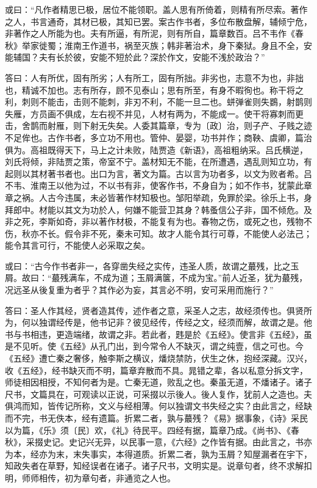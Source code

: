 \documentclass[]{article}
\begin{document}
或曰：``凡作者精思已极，居位不能领职。盖人思有所倚着，则精有所尽索。著作之人，书言通奇，其材已极，其知已罢。案古作书者，多位布散盘解，辅倾宁危，非著作之人所能为也。夫有所逼，有所泥，则有所自，篇章数百。吕不韦作《春秋》举家徙蜀；淮南王作道书，祸至灭族；韩非著治术，身下秦狱。身且不全，安能辅国？夫有长於彼，安能不短於此？深於作文，安能不浅於政治？''

答曰：人有所优，固有所劣；人有所工，固有所拙。非劣也，志意不为也，非拙也，精诚不加也。志有所存，顾不见泰山；思有所至，有身不暇徇也。称干将之利，刺则不能击，击则不能刺，非刃不利，不能一旦二也。蛢弹雀则失鷃，射鹊则失雁，方员画不俱成，左右视不并见，人材有两为，不能成一。使干将寡刺而更击，舍鹊而射雁，则下射无失矣。人委其篇章，专为〔政〕治，则子产、子贱之迹不足侔也。古作书者，多立功不用也。管仲、晏婴，功书并作；商鞅、虞卿，篇治俱为。高祖既得天下，马上之计未败，陆贾造《新语》，高祖粗纳采。吕氏横逆，刘氏将倾，非陆贾之策，帝室不宁。盖材知无不能，在所遭遇，遇乱则知立功，有起则以其材著书者也。出口为言，著文为篇。古以言为功者多，以文为败者希。吕不韦、淮南王以他为过，不以书有非，使客作书，不身自为；如不作书，犹蒙此章章之祸。人古今违属，未必皆著作材知极也。邹阳举疏，免罪於梁。徐乐上书，身拜郎中。材能以其文为功於人，何嫌不能营卫其身？韩蚤信公子非，国不倾危。及非之死，李斯如奇，非以著作材极，不能复有为也。春物之伤，或死之也，残物不伤，秋亦不长。假令非不死，秦未可知。故才人能令其行可尊，不能使人必法己；能令其言可行，不能使人必采取之矣。

或曰：``古今作书者非一，各穿凿失经之实传，违圣人质，故谓之蕞残，比之玉屑。故曰：``蕞残满车，不成为道；玉屑满箧，不成为宝。''前人近圣，犹为蕞残，况远圣从後复重为者乎？其作必为妄，其言必不明，安可采用而施行？''

答曰：圣人作其经，贤者造其传，述作者之意，采圣人之志，故经须传也。俱贤所为，何以独谓经传是，他书记非？彼见经传，传经之文，经须而解，故谓之是。他书与书相违，更造端绪，故谓之非。若此者，韪是於《五经》。使言非《五经》，虽是不见听。使《五经》从孔门出，到今常令人不缺灭，谓之纯壹，信之可也。今《五经》遭亡秦之奢侈，触李斯之横议，燔烧禁防，伏生之休，抱经深藏。汉兴，收《五经》，经书缺灭而不明，篇章弃散而不具。晁错之辈，各以私意分拆文字，师徒相因相授，不知何者为是。亡秦无道，败乱之也。秦虽无道，不燔诸子。诸子尺书，文篇具在，可观读以正说，可采掇以示後人。後人复作，犹前人之造也。夫俱鸿而知，皆传记所称，文义与经相薄。何以独谓文书失经之实？由此言之，经缺而不完，书无佚本，经有遗篇。折累二者，孰与蕞残？《易》据事象，《诗》采民以为篇，《乐》须〔民〕欢，《礼》待民平。四经有据，篇章乃成。《尚书》、《春秋》，采掇史记。史记兴无异，以民事一意，《六经》之作皆有据。由此言之，书亦为本，经亦为末，末失事实，本得道质。折累二者，孰为玉屑？知屋漏者在宇下，知政失者在草野，知经误者在诸子。诸子尺书，文明实是。说章句者，终不求解扣明，师师相传，初为章句者，非通览之人也。
\end{document}
